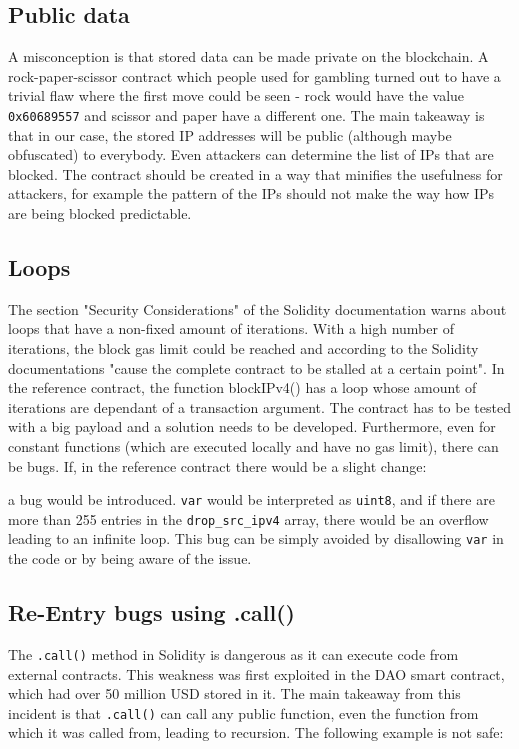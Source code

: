

\subsection{Public data}
A misconception is that stored data can be made private on the blockchain. A rock-paper-scissor contract which people used for gambling turned out to have a trivial flaw where the first move could be seen - rock would have the value \texttt{0x60689557} and scissor and paper have a different one.
The main takeaway is that in our case, the stored IP addresses will be public (although maybe obfuscated) to everybody. Even attackers can determine the list of IPs that are blocked. The contract should be created in a way that minifies the usefulness for attackers, for example the pattern of the IPs should not make the way how IPs are being blocked predictable.

\subsection{Loops}
The section "Security Considerations" of the Solidity documentation warns about loops that have a non-fixed amount of iterations. With a high number of iterations, the block gas limit could be reached and according to the Solidity documentations "cause the complete contract to be stalled at a certain point". In the reference contract, the function blockIPv4() has a loop whose amount of iterations are dependant of a transaction argument. The contract has to be tested with a big payload and a solution needs to be developed.
Furthermore, even for constant functions (which are executed locally and have no gas limit), there can be bugs. If, in the reference contract there would be a slight change:



a bug would be introduced. \texttt{var} would be interpreted as \texttt{uint8}, and if there are more than 255 entries in the \texttt{drop\_src\_ipv4} array, there would be an overflow leading to an infinite loop.
This bug can be simply avoided by disallowing \texttt{var} in the code or by being aware of the issue.


\subsection{Re-Entry bugs using .call()}

The \texttt{.call()} method in Solidity is dangerous as it can execute code from external contracts. This weakness was first exploited in the DAO smart contract, which had over 50 million USD stored in it. The main takeaway from this incident is that \texttt{.call()} can call any public function, even the function from which it was called from, leading to recursion.
The following example is not safe:

